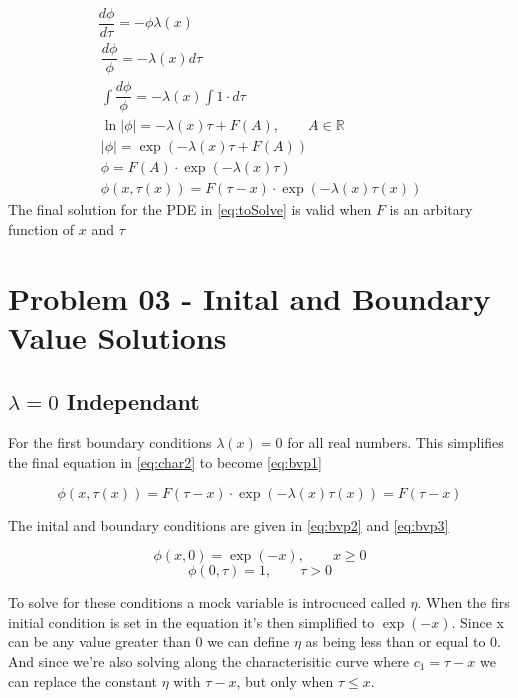 \documentclass[paper=a4, fontsize=11pt]{scrartcl} %
\numberwithin{equation}{section} %
\numberwithin{figure}{section} %
\numberwithin{table}{section} %
\begin{document}
	\begin{align} \label{eq:char2}
		\dfrac{d\phi}{d\tau} = -\phi\lambda(x) \\
		~
		\dfrac{d\phi}{\phi} = -\lambda(x)d\tau \\
		~
		\int{\dfrac{d\phi}{\phi}} = -\lambda(x)\int{1\cdot d\tau} \\
		~
		\ln|\phi| = -\lambda(x)\tau + F(A), \qquad A \in \mathbb{R} \\
		~
		|\phi| = \exp(-\lambda(x)\tau + F(A)) \\
		~
		\phi = F(A)\cdot\exp(-\lambda(x)\tau) \\
		~
		\phi(x, \tau(x)) = F(\tau-x)\cdot\exp(-\lambda(x)\tau(x))
	\end{align}
The final solution for the PDE in \ref{eq:toSolve} is valid when $F$ is an arbitary function of $x$ and $\tau$

\section*{Problem 03 - Inital and Boundary Value Solutions}
\subsection{$\lambda=0$ Independant}
For the first boundary conditions $\lambda(x)=0$ for all real numbers. This simplifies the final equation in \ref{eq:char2} to become \ref{eq:bvp1}

\begin{equation}\label{eq:bvp1}
	\phi(x, \tau(x)) = F(\tau-x)\cdot\exp(-\lambda(x)\tau(x)) = F(\tau-x)
\end{equation}

The inital and boundary conditions are given in \ref{eq:bvp2} and \ref{eq:bvp3}

\begin{equation}\label{eq:bvp2}
	\phi(x,0) = \exp(-x), \qquad x \ge 0
\end{equation}
\begin{equation}\label{eq:bvp3}
	\phi(0,\tau) = 1, \qquad \tau > 0
\end{equation}

To solve for these conditions a mock variable is introcuced called $\eta$. When the firs initial condition is set in the equation it's then simplified to $\exp(-x)$. Since x can be any value greater than 0 we can define $\eta$ as being less than or equal to 0. And since we're also solving along the characterisitic curve where $c_1 = \tau-x$ we can replace the constant $\eta$ with $\tau-x$, but only when $\tau \le x$.
\end{document}
